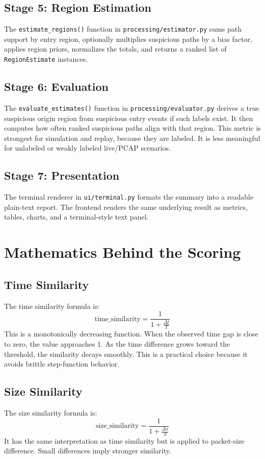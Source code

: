 \documentclass[12pt,a4paper]{report}
\begin{document}
\section{Stage 5: Region Estimation}
The \texttt{estimate\_regions()} function in \texttt{processing/estimator.py} sums path support by entry region, optionally multiplies suspicious paths by a bias factor, applies region priors, normalizes the totals, and returns a ranked list of \texttt{RegionEstimate} instances.

\section{Stage 6: Evaluation}
The \texttt{evaluate\_estimates()} function in \texttt{processing/evaluator.py} derives a true suspicious origin region from suspicious entry events if such labels exist. It then computes how often ranked suspicious paths align with that region. This metric is strongest for simulation and replay, because they are labeled. It is less meaningful for unlabeled or weakly labeled live/PCAP scenarios.

\section{Stage 7: Presentation}
The terminal renderer in \texttt{ui/terminal.py} formats the summary into a readable plain-text report. The frontend renders the same underlying result as metrics, tables, charts, and a terminal-style text panel.

\chapter{Mathematics Behind the Scoring}
\section{Time Similarity}
The time similarity formula is:
\[
\text{time\_similarity} = \frac{1}{1 + \frac{\Delta t}{T}}
\]
This is a monotonically decreasing function. When the observed time gap is close to zero, the value approaches 1. As the time difference grows toward the threshold, the similarity decays smoothly. This is a practical choice because it avoids brittle step-function behavior.

\section{Size Similarity}
The size similarity formula is:
\[
\text{size\_similarity} = \frac{1}{1 + \frac{\Delta s}{S}}
\]
It has the same interpretation as time similarity but is applied to packet-size difference. Small differences imply stronger similarity.
\end{document}
